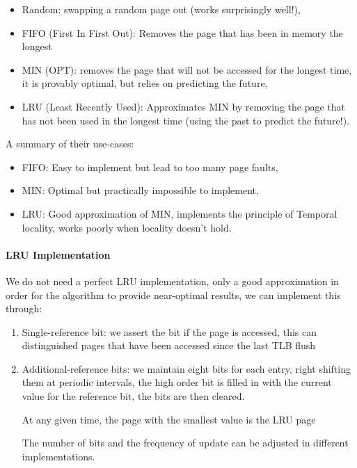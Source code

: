 \documentclass[openright, twoside]{report}
\theoremstyle{definition}
\theoremstyle{example}
\begin{document}
\begin{itemize}
	\item Random: swapping a random page out (works surprisingly well!),
	\item FIFO (First In First Out): Removes the page that has been in memory the longest
	\item MIN (OPT): removes the page that will not be accessed for the longest time, 
	it is provably optimal, but relies on predicting the future,
	\item LRU (Least Recently Used): Approximates MIN by removing the page that has not 
	been used in the longest time (using the past to predict the future!).
\end{itemize}

A summary of their use-cases:
\begin{itemize}
	\item FIFO: Easy to implement but lead to too many page faults,
	\item MIN: Optimal but practically impossible to implement,
	\item LRU: Good approximation of MIN, implements the principle of 
	Temporal locality, works poorly when locality doesn't hold.
\end{itemize}

\paragraph{LRU Implementation}
We do not need a perfect LRU implementation, only a good approximation in order for 
the algorithm to provide near-optimal results, we can implement this through:

\begin{enumerate}
	\item Single-reference bit: we assert the bit if the page is accessed, this can 
	distinguished pages that have been accessed since the last TLB flush
	\item Additional-reference bits: we maintain eight bits for each entry, right 
	shifting them at periodic intervals, the high order bit is filled in with 
	the current value for the reference bit, the bits are then cleared.

	\begin{center}
		At any given time, the page with the smallest value is the LRU page
	\end{center}
	
	The number of bits and the frequency of update can be adjusted in different implementations.
\end{enumerate}
\end{document}
